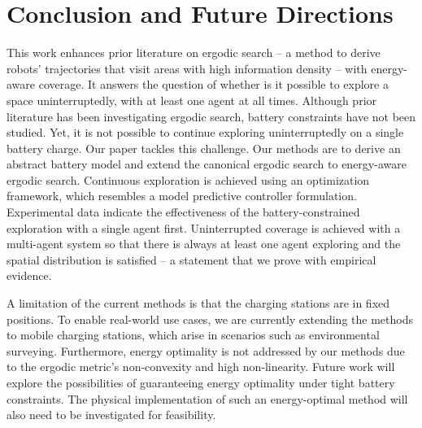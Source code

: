 \documentclass[letterpaper,10pt,conference,twoside]{IEEEtran}
\theoremstyle{definition}
\begin{document}
\section{Conclusion and Future Directions}\label{sec:conc}
\noindent
This work enhances prior literature on ergodic search -- a method to derive robots' trajectories that visit areas with high information density -- with energy-aware coverage. It answers the question of whether is it possible to explore a space uninterruptedly, with at least one agent at all times. Although prior literature has been investigating ergodic search, battery constraints have not been studied. Yet, it is not possible to continue exploring uninterruptedly on a single battery charge. Our paper tackles this challenge. Our methods are to derive an abstract battery model and extend the canonical ergodic search to energy-aware ergodic search. Continuous exploration is achieved using an %
optimization framework, which resembles a model predictive controller formulation. Experimental data indicate the effectiveness of the battery-constrained exploration with a single agent first. Uninterrupted coverage is achieved with a multi-agent system so that there is always at least one agent exploring and the spatial distribution is satisfied -- a statement that we prove with empirical evidence.

A limitation of the current methods is that the charging stations are in fixed positions. To enable real-world use cases, we are currently extending the methods to mobile charging stations, which arise in scenarios such as environmental surveying. Furthermore, energy optimality is not addressed by our methods due to the ergodic metric's non-convexity and high non-linearity. Future work will explore the possibilities of guaranteeing energy optimality under tight battery constraints. The physical implementation of such an energy-optimal method will also need to be investigated for feasibility.

{\small
 

}
\end{document}
